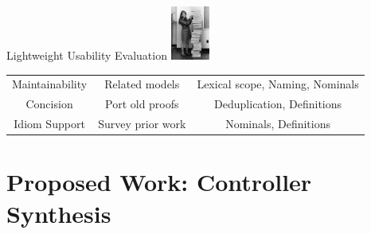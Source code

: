 \documentclass[slidestop,aspectratio=169]{beamer}
\theoremstyle{plain}
\theoremstyle{definition}
\theoremstyle{remark}
\newcommand{\logicuser}[1][1in]{\includegraphics[width=#1]{img/hamilton.png}}
\begin{document}
\begin{frame}[t,fragile]{Lightweight Usability Evaluation}
\logicuser[0.5in]

\begin{center}
\begin{tabular}{ccc}
{\color{vblue}{Goal}}            & {\color{vblue}{How Evaluated}}     & {\color{vblue}{Supporting Features}} \\\hline
Maintainability & Related models    & Lexical scope, Naming, Nominals \\
Concision       & Port old proofs   & Deduplication, Definitions\\
Idiom Support   & Survey prior work & Nominals, Definitions
\end{tabular}
\end{center}
\end{frame}


\section{Proposed Work: Controller Synthesis}
\end{document}

